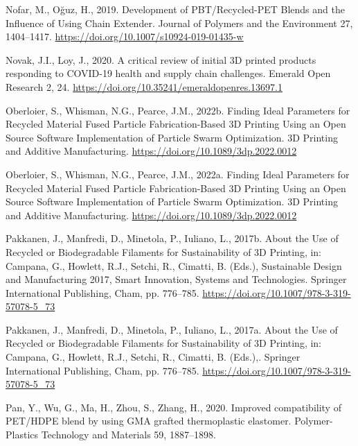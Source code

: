 \documentclass[
  12pt,
  number,
  review]{elsarticle}
\newlength{\cslhangindent}
\newlength{\cslentryspacingunit} %
\newenvironment{CSLReferences}[2] %
 {%
  \setlength{\parindent}{0pt}
  \ifodd #1
  \let\oldpar\par
  \def\par{\hangindent=\cslhangindent\oldpar}
  \fi
  \setlength{\parskip}{#2\cslentryspacingunit}
 }%
 {}
\begin{document}
\begin{CSLReferences}{1}{0}
\leavevmode{}%
Nofar, M., Oğuz, H., 2019. Development of {PBT}/{Recycled-PET Blends}
and the {Influence} of {Using Chain Extender}. Journal of Polymers and
the Environment 27, 1404--1417.
\url{https://doi.org/10.1007/s10924-019-01435-w}

\leavevmode{}%
Novak, J.I., Loy, J., 2020. A critical review of initial {3D} printed
products responding to {COVID-19} health and supply chain challenges.
Emerald Open Research 2, 24.
\url{https://doi.org/10.35241/emeraldopenres.13697.1}

\leavevmode{}%
Oberloier, S., Whisman, N.G., Pearce, J.M., 2022b. Finding {Ideal
Parameters} for {Recycled Material Fused Particle Fabrication-Based 3D
Printing Using} an {Open Source Software Implementation} of {Particle
Swarm Optimization}. 3D Printing and Additive Manufacturing.
\url{https://doi.org/10.1089/3dp.2022.0012}

\leavevmode{}%
Oberloier, S., Whisman, N.G., Pearce, J.M., 2022a. Finding {Ideal
Parameters} for {Recycled Material Fused Particle Fabrication-Based 3D
Printing Using} an {Open Source Software Implementation} of {Particle
Swarm Optimization}. 3D Printing and Additive Manufacturing.
\url{https://doi.org/10.1089/3dp.2022.0012}

\leavevmode{}%
Pakkanen, J., Manfredi, D., Minetola, P., Iuliano, L., 2017b. About the
{Use} of {Recycled} or {Biodegradable Filaments} for {Sustainability} of
{3D Printing}, in: Campana, G., Howlett, R.J., Setchi, R., Cimatti, B.
(Eds.), Sustainable {Design} and {Manufacturing} 2017, Smart
{Innovation}, {Systems} and {Technologies}. {Springer International
Publishing}, {Cham}, pp. 776--785.
\url{https://doi.org/10.1007/978-3-319-57078-5_73}

\leavevmode{}%
Pakkanen, J., Manfredi, D., Minetola, P., Iuliano, L., 2017a. About the
{Use} of {Recycled} or {Biodegradable Filaments} for {Sustainability} of
{3D Printing}, in: Campana, G., Howlett, R.J., Setchi, R., Cimatti, B.
(Eds.),. {Springer International Publishing}, {Cham}, pp. 776--785.
\url{https://doi.org/10.1007/978-3-319-57078-5_73}

\leavevmode{}%
Pan, Y., Wu, G., Ma, H., Zhou, S., Zhang, H., 2020. Improved
compatibility of PET/HDPE blend by using GMA grafted thermoplastic
elastomer. Polymer-Plastics Technology and Materials 59, 1887--1898.


\end{CSLReferences}
\end{document}
